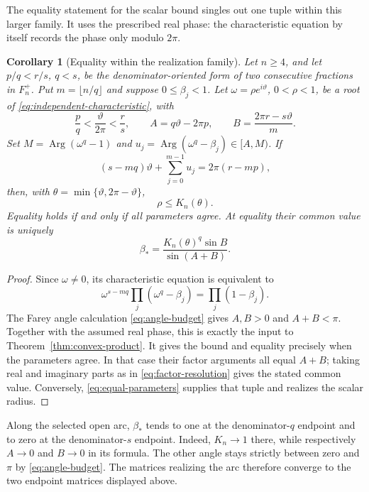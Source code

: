 \documentclass[11pt,a4paper]{article}
\newtheorem{corollary}[theorem]{Corollary}
\theoremstyle{definition}
\theoremstyle{remark}
\numberwithin{equation}{section}
\begin{document}
The equality statement for the scalar bound singles out one tuple within this larger family. It uses the prescribed real phase: the characteristic equation by itself records the phase only modulo $2\pi$.

\begin{corollary}[Equality within the realization family]\label{cor:family-equality}
Let $n\ge4$, and let $p/q<r/s$, $q<s$, be the denominator-oriented form of two consecutive fractions in $F_n^+$. Put $m=\lfloor n/q\rfloor$ and suppose $0\le\beta_j<1$.
Let $\omega=\rho e^{i\vartheta}$, $0<\rho<1$, be a root of \eqref{eq:independent-characteristic}, with
\[
 \frac pq<\frac{\vartheta}{2\pi}<\frac rs,
 \qquad A=q\vartheta-2\pi p,\qquad B=\frac{2\pi r-s\vartheta}{m}.
\]
Set $M=\operatorname{Arg}(\omega^q-1)$ and $u_j=\operatorname{Arg}(\omega^q-\beta_j)\in[A,M)$. If
\[
 (s-mq)\vartheta+\sum_{j=0}^{m-1}u_j=2\pi(r-mp),
\]
then, with $\theta=\min\{\vartheta,2\pi-\vartheta\}$,
\[
 \rho\le K_n(\theta).
\]
Equality holds if and only if all parameters agree. At equality their common value is uniquely
\[
 \beta_*=\frac{K_n(\theta)^q\sin B}{\sin(A+B)}.
\]
\end{corollary}
\begin{proof}
Since $\omega\ne0$, its characteristic equation is equivalent to
\[
 \omega^{s-mq}\prod_j(\omega^q-\beta_j)=\prod_j(1-\beta_j).
\]
The Farey angle calculation \eqref{eq:angle-budget} gives $A,B>0$ and $A+B<\pi$. Together with the assumed real phase, this is exactly the input to Theorem~\ref{thm:convex-product}. It gives the bound and equality precisely when the parameters agree. In that case their factor arguments all equal $A+B$; taking real and imaginary parts as in \eqref{eq:factor-resolution} gives the stated common value. Conversely, \eqref{eq:equal-parameters} supplies that tuple and realizes the scalar radius.
\end{proof}

Along the selected open arc, $\beta_*$ tends to one at the denominator-$q$ endpoint and to zero at the denominator-$s$ endpoint. Indeed, $K_n\to1$ there, while respectively $A\to0$ and $B\to0$ in its formula. The other angle stays strictly between zero and $\pi$ by \eqref{eq:angle-budget}. The matrices realizing the arc therefore converge to the two endpoint matrices displayed above.


\end{document}
